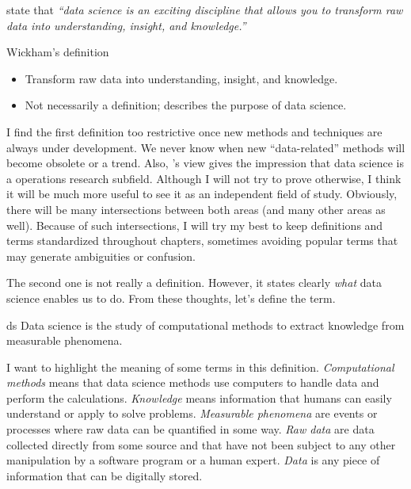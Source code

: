 \textcite{Wickham2023} state that \emph{``data science is an exciting discipline that
allows you to transform raw data into understanding, insight, and knowledge.''}

\begin{slidebox}{Wickham's definition}{}
  \begin{itemize}
    \item Transform raw data into understanding, insight, and knowledge.
    \item Not necessarily a definition; describes the purpose of data science.
  \end{itemize}
\end{slidebox}

I find the first definition too restrictive once new methods and techniques are always
under development.  We never know when new ``data-related'' methods will become obsolete
or a trend.  Also, \citeauthor{Zumel2019}'s view gives the impression that data science is a
operations research subfield.  Although I will not try to prove otherwise, I think it will
be much more useful to see it as an independent field of study.  Obviously, there will be
many intersections between both areas (and many other areas as well).  Because of such
intersections, I will try my best to keep definitions and
terms standardized throughout chapters, sometimes avoiding popular terms that may generate
ambiguities or confusion.

The second one is not really a definition.  However, it states clearly \emph{what} data
science enables us to do.  From these thoughts, let's define the term.

\begin{defbox}{}{ds}
  Data science is the study of computational methods to extract knowledge from
  measurable phenomena.
\end{defbox}

I want to highlight the meaning of some terms in this definition.  \emph{Computational methods} means
that data science methods use computers to handle data and perform the calculations.
\emph{Knowledge} means information that humans can easily understand or apply to solve
problems.  \emph{Measurable phenomena} are events or processes where raw data can be
quantified in some way.  \emph{Raw data} are data collected directly from some source and
that have not been subject to any other manipulation by a software program or a human
expert.  \emph{Data} is any piece of information that can be digitally stored.


